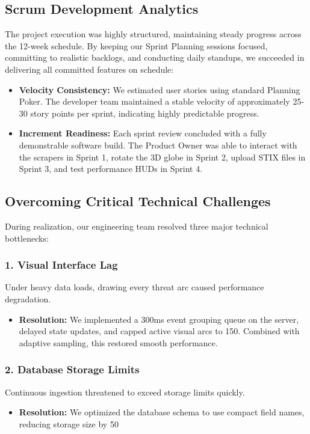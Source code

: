 \subsection{Scrum Development Analytics}
The project execution was highly structured, maintaining steady progress across the 12-week schedule. By keeping our Sprint Planning sessions focused, committing to realistic backlogs, and conducting daily standups, we succeeded in delivering all committed features on schedule:
\begin{itemize}
    \item \textbf{Velocity Consistency:} We estimated user stories using standard Planning Poker. The developer team maintained a stable velocity of approximately 25-30 story points per sprint, indicating highly predictable progress.
    \item \textbf{Increment Readiness:} Each sprint review concluded with a fully demonstrable software build. The Product Owner was able to interact with the scrapers in Sprint 1, rotate the 3D globe in Sprint 2, upload STIX files in Sprint 3, and test performance HUDs in Sprint 4.
\end{itemize}

\subsection{Overcoming Critical Technical Challenges}
During realization, our engineering team resolved three major technical bottlenecks:

\subsubsection{1. Visual Interface Lag}
Under heavy data loads, drawing every threat arc caused performance degradation.
\begin{itemize}
    \item \textbf{Resolution:} We implemented a 300ms event grouping queue on the server, delayed state updates, and capped active visual arcs to 150. Combined with adaptive sampling, this restored smooth performance.
\end{itemize}

\subsubsection{2. Database Storage Limits}
Continuous ingestion threatened to exceed storage limits quickly.
\begin{itemize}
    \item \textbf{Resolution:} We optimized the database schema to use compact field names, reducing storage size by 50%
\end{itemize}

